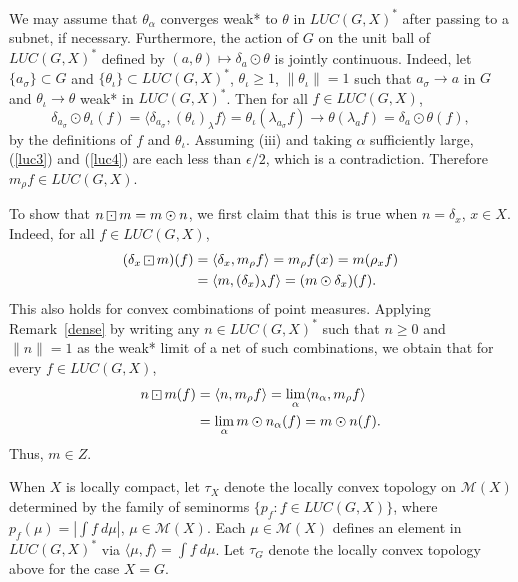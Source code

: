 We may assume that $\theta_\alpha$ converges weak* to $\theta$ in $LUC(G,X)^*$ after passing
to a subnet, if necessary.  Furthermore, the action of $G$ on the unit ball of $LUC(G,X)^*$
defined by $(a,\theta)\mapsto \delta_a \odot \theta$ is jointly continuous.  Indeed,
let $\{a_\sigma\}\subset G$ and $\{\theta_\iota\}\subset LUC(G,X)^*$, $\theta_\iota \geq 1$, $\|\theta_\iota\|=1$
such that $a_\sigma \rightarrow a$ in $G$ and $\theta_\iota \rightarrow \theta$ weak* in $LUC(G,X)^*$.  Then
for all $f\in LUC(G,X)$,
\[
\delta_{a_\sigma} \odot \theta_\iota (f) = \langle \delta_{a_\sigma},(\theta_\iota)_\lambda f\rangle
= \theta_\iota (\lambda_{a_\sigma} f) \rightarrow \theta(\lambda_a f)
= \delta_a \odot \theta(f),
\]
by the definitions of $f$ and $\theta_\iota$.
Assuming (iii) and taking $\alpha$
sufficiently large, (\ref{luc3}) and (\ref{luc4}) are each less than $\epsilon/2$,
which is a contradiction.  Therefore $m_\rho f \in LUC(G,X)$.

To show that $n\dotbox m = m \odot n$,
we first claim that this is true when $n = \delta_x$, $x\in X$.  Indeed, for all $f\in LUC(G,X)$,
\begin{align*}
(\delta_x \dotbox m)(f) &= \langle\delta_x, m_\rho f\rangle = m_\rho f(x) = m(\rho_x f) \\
&= \langle m, (\delta_x )_\lambda f\rangle = (m\odot\delta_x )(f).
\end{align*}
This also holds for convex combinations of point measures.  Applying Remark~\ref{dense}
by writing any $n \in LUC(G,X)^*$ such that $n \geq 0$ and $\|n\|=1$ as the weak* limit of a net
of such combinations, we obtain that for every $f \in LUC(G,X)$,
\begin{align*}
n\dotbox m(f) &= \langle n, m_\rho f \rangle = \lim_\alpha \langle n_\alpha, m_\rho f\rangle \\
&= \lim_\alpha m \odot n_\alpha(f) = m \odot n(f).
\end{align*}
Thus, $m \in Z$.
\done

When $X$ is locally compact, let $\tau_X$ denote the locally convex topology on $\mathcal{M}(X)$
determined by the family of seminorms $\{p_f : f\in LUC(G,X)\}$, where
$p_f (\mu) =| \int f\:d\mu|$, $\mu\in \mathcal{M}(X)$.  Each $\mu\in \mathcal{M}(X)$ defines an element in $LUC(G,X)^*$ via
$\langle \mu, f\rangle = \int f\:d\mu$.
Let $\tau_G$ denote the locally convex topology above for the case $X=G$.

